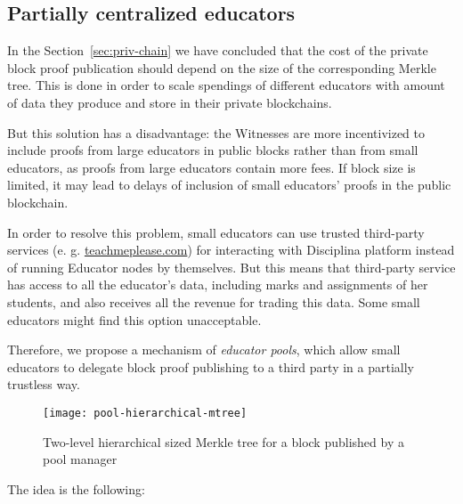\subsection{Partially centralized educators}
\label{apx:pools}

In the Section~\ref{sec:priv-chain} we have concluded that the cost of the
private block proof publication should depend on the size of the corresponding
Merkle tree. This is done in order to scale spendings of different educators
with amount of data they produce and store in their private blockchains.

But this solution has a disadvantage: the Witnesses are more incentivized to
include proofs from large educators in public blocks rather than from small
educators, as proofs from large educators contain more fees. If block size is
limited, it may lead to delays of inclusion of small educators' proofs in the
public blockchain.

In order to resolve this problem, small educators can use trusted third-party
services (e. g. \url{teachmeplease.com}) for interacting with Disciplina
platform instead of running Educator nodes by themselves. But this means that
third-party service has access to all the educator's data, including marks and
assignments of her students, and also receives all the revenue for trading this
data. Some small educators might find this option unacceptable.

Therefore, we propose a mechanism of \textit{educator pools}, which allow small
educators to delegate block proof publishing to a third party in a partially trustless
way.

\begin{figure}[ht]
  \centering
  \texttt{[image: pool-hierarchical-mtree]}
  \caption{Two-level hierarchical sized Merkle tree for a block published by a pool
    manager}
  \label{fig:pools:lvl2block}
\end{figure}

The idea is the following:

